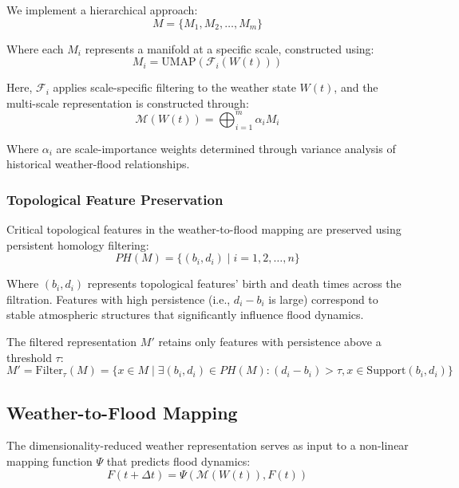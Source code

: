 \documentclass{article}
\begin{document}
We implement a hierarchical approach:
\begin{equation}
M = \{M_1, M_2, \ldots, M_m\}
\end{equation}

Where each $M_i$ represents a manifold at a specific scale, constructed using:
\begin{equation}
M_i = \text{UMAP}(\mathcal{F}_i(W(t)))
\end{equation}

Here, $\mathcal{F}_i$ applies scale-specific filtering to the weather state $W(t)$, and the multi-scale representation is constructed through:
\begin{equation}
\mathcal{M}(W(t)) = \bigoplus_{i=1}^{m} \alpha_i M_i
\end{equation}

Where $\alpha_i$ are scale-importance weights determined through variance analysis of historical weather-flood relationships.

\subsubsection{Topological Feature Preservation}
Critical topological features in the weather-to-flood mapping are preserved using persistent homology filtering:
\begin{equation}
PH(M) = \{(b_i, d_i) \mid i = 1, 2, \ldots, n\}
\end{equation}

Where $(b_i, d_i)$ represents topological features' birth and death times across the filtration. Features with high persistence (i.e., $d_i - b_i$ is large) correspond to stable atmospheric structures that significantly influence flood dynamics.

The filtered representation $M'$ retains only features with persistence above a threshold $\tau$:
\begin{equation}
M' = \text{Filter}_\tau(M) = \{x \in M \mid \exists (b_i, d_i) \in PH(M) : (d_i - b_i) > \tau, x \in \text{Support}(b_i, d_i)\}
\end{equation}

\subsection{Weather-to-Flood Mapping}
The dimensionality-reduced weather representation serves as input to a non-linear mapping function $\Psi$ that predicts flood dynamics:
\begin{equation}
F(t+\Delta t) = \Psi(\mathcal{M}(W(t)), F(t))
\end{equation}
\end{document}
